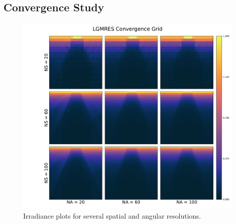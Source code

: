 \documentclass[10pt]{article}
\begin{document}
\subsection{Convergence Study}
\begin{figure}[H]
	\centering
	\includegraphics[width=\textwidth]{img/lgmres_conv.pdf}
	\caption{Irradiance plots for several spatial and angular resolutions.}
\end{figure}
\end{document}
